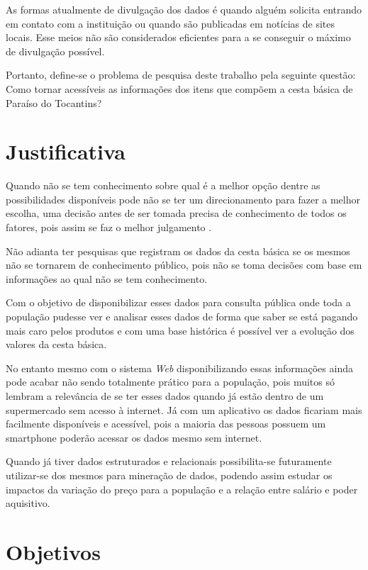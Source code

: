 \documentclass{ifto-tex}
\begin{document}
As formas atualmente de divulgação dos dados é quando alguém solicita entrando em contato com a instituição ou quando são publicadas em notícias de sites locais. Esse meios não são considerados eficientes para a se conseguir o máximo de divulgação possível.

Portanto, define-se o problema de pesquisa deste trabalho pela seguinte questão: Como tornar acessíveis as informações dos itens que compõem a  cesta básica de Paraíso do Tocantins?
	
	\section{Justificativa}
	
		Quando não se tem conhecimento sobre qual é a melhor opção dentre as possibilidades disponíveis pode não se ter um direcionamento para fazer a melhor escolha, uma decisão antes de ser tomada precisa de conhecimento de todos os fatores, pois assim se faz o melhor julgamento \cite{bezerra2013efeito}.

Não adianta ter pesquisas que registram os dados da cesta básica se os mesmos não se tornarem de conhecimento público, pois não se toma decisões com base em informações ao qual não se tem conhecimento.

Com o objetivo de disponibilizar esses dados para consulta pública onde toda a população pudesse ver e analisar esses dados de forma que saber se está pagando mais caro pelos produtos e com uma base histórica é possível ver a evolução dos valores da cesta básica.

No entanto mesmo com o sistema \textit{Web} disponibilizando essas informações ainda pode acabar não sendo totalmente prático para a população, pois muitos só lembram a relevância de se ter esses dados quando já estão dentro de um supermercado sem acesso à  internet. Já com um aplicativo os dados ficariam mais facilmente disponíveis e acessível, pois a maioria das pessoas possuem um smartphone poderão acessar os dados mesmo sem internet.

Quando já tiver dados estruturados e relacionais possibilita-se futuramente utilizar-se dos mesmos para mineração de dados, podendo assim estudar os impactos da variação do preço para a população e a relação entre salário e poder aquisitivo.
	
	\section{Objetivos}
	
\end{document}
